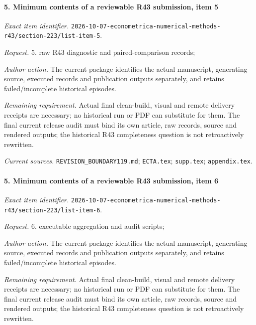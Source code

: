 \paragraph{5. Minimum contents of a reviewable R43 submission, item 5}

\emph{Exact item identifier.} \nolinkurl{2026-10-07-econometrica-numerical-methods-r43/section-223/list-item-5}.

\par\emph{Request.} 5. raw R43 diagnostic and paired-comparison records;

\par\emph{Author action.} The current package identifies the actual manuscript, generating source, executed records and publication outputs separately, and retains failed/\allowbreak{}incomplete historical episodes.

\par\emph{Remaining requirement.} Actual final clean-build, visual and remote delivery receipts are necessary; no historical run or PDF can substitute for them. The final current release audit must bind its own article, raw records, source and rendered outputs; the historical R43 completeness question is not retroactively rewritten.

\par\emph{Current sources.} \nolinkurl{REVISION_BOUNDARY119.md}; \nolinkurl{ECTA.tex}; \nolinkurl{supp.tex}; \nolinkurl{appendix.tex}.

\paragraph{5. Minimum contents of a reviewable R43 submission, item 6}

\emph{Exact item identifier.} \nolinkurl{2026-10-07-econometrica-numerical-methods-r43/section-223/list-item-6}.

\par\emph{Request.} 6. executable aggregation and audit scripts;

\par\emph{Author action.} The current package identifies the actual manuscript, generating source, executed records and publication outputs separately, and retains failed/\allowbreak{}incomplete historical episodes.

\par\emph{Remaining requirement.} Actual final clean-build, visual and remote delivery receipts are necessary; no historical run or PDF can substitute for them. The final current release audit must bind its own article, raw records, source and rendered outputs; the historical R43 completeness question is not retroactively rewritten.

